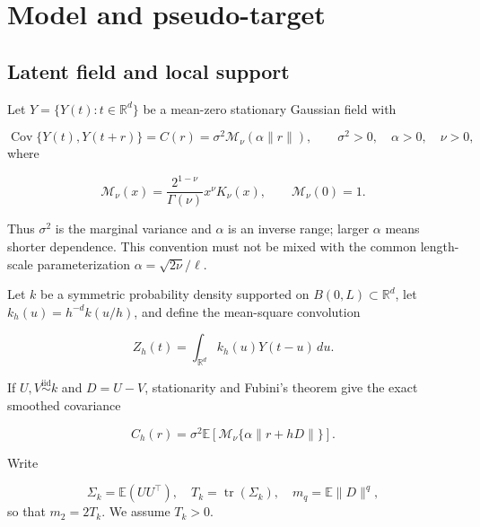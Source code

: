 \documentclass[11pt]{article}
\theoremstyle{remark}
\newcommand{\Matern}{\mathcal M}
\newcommand{\E}{\mathbb E}
\newcommand{\R}{\mathbb R}
\newcommand{\tr}{\operatorname{tr}}
\begin{document}
\section{Model and pseudo-target}

\subsection{Latent field and local support}

Let \(Y=\{Y(t):t\in\R^d\}\) be a mean-zero stationary Gaussian field with

\begin{equation}
  \operatorname{Cov}\{Y(t),Y(t+r)\}
  = C(r)=\sigma^2\Matern_\nu(\alpha\lVert r\rVert),
  \qquad \sigma^2>0,\quad \alpha>0,\quad \nu>0,
  \label{eq:matern-covariance}
\end{equation}
where

\begin{equation}
  \Matern_\nu(x)
  =\frac{2^{1-\nu}}{\Gamma(\nu)}x^\nu K_\nu(x),
  \qquad \Matern_\nu(0)=1.
  \label{eq:matern-correlation}
\end{equation}

Thus \(\sigma^2\) is the marginal variance and \(\alpha\) is an inverse range;
larger \(\alpha\) means shorter dependence.
This convention must not be mixed with the common length-scale parameterization
\(\alpha=\sqrt{2\nu}/\ell\).

Let \(k\) be a symmetric probability density supported on
\(B(0,L)\subset\R^d\), let \(k_h(u)=h^{-d}k(u/h)\), and define the mean-square
convolution

\begin{equation}
  Z_h(t)=\int_{\R^d} k_h(u)Y(t-u)\,du.
  \label{eq:smoothed-field}
\end{equation}

If \(U,V\stackrel{\mathrm{iid}}{\sim}k\) and \(D=U-V\), stationarity and Fubini's
theorem give the exact smoothed covariance

\begin{equation}
  C_h(r)
  =\sigma^2\E\!\left[\Matern_\nu\{\alpha\lVert r+hD\rVert\}\right].
  \label{eq:smoothed-covariance}
\end{equation}

Write

\begin{equation}
  \Sigma_k=\E(UU^\top),\quad T_k=\tr(\Sigma_k),\quad
  m_q=\E\lVert D\rVert^q,
  \label{eq:kernel-moments}
\end{equation}
so that \(m_2=2T_k\).  We assume \(T_k>0\).
\end{document}
